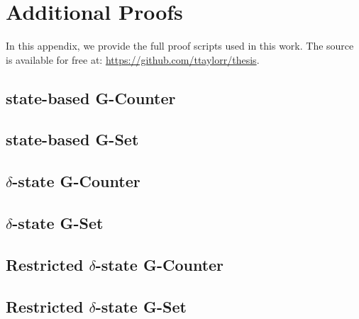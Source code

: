 \chapter{Additional Proofs}

In this appendix, we provide the full proof scripts used in this work. The
source is available for free at: \url{https://github.com/ttaylorr/thesis}.

\section{state-based G-Counter \CRDT}
\label{sec:app-gcounter-comm-assoc}


\section{state-based G-Set \CRDT}


\section{$\delta$-state G-Counter \CRDT}


\section{$\delta$-state G-Set \CRDT}


\section{Restricted $\delta$-state G-Counter \CRDT}


\section{Restricted $\delta$-state G-Set \CRDT}

